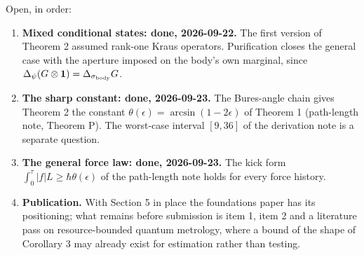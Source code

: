\documentclass[11pt,a4paper]{article}
\newcommand{\tightlist}{\setlength{\itemsep}{0pt}\setlength{\parskip}{0pt}}
\begin{document}
Open, in order:

\begin{enumerate}
\def\labelenumi{\arabic{enumi}.}
\tightlist
\item
  \textbf{Mixed conditional states: done, 2026-09-22.} The first version
  of Theorem 2 assumed rank-one Kraus operators. Purification closes the
  general case with the aperture imposed on the body's own marginal,
  since \(\Delta_\psi(G\otimes\mathbf 1)=\Delta_{\sigma_{\rm body}}G\).
\item
  \textbf{The sharp constant: done, 2026-09-23.} The Bures-angle chain
  gives Theorem 2 the constant \(\theta(\epsilon)=\arcsin(1-2\epsilon)\)
  of Theorem 1 (path-length note, Theorem P). The worst-case interval
  \([9,36]\) of the derivation note is a separate question.
\item
  \textbf{The general force law: done, 2026-09-23.} The kick form
  \(\int_0^\tau|f|L\ge\hbar\theta(\epsilon)\) of the path-length note
  holds for every force history.
\item
  \textbf{Publication.} With Section 5 in place the foundations paper
  has its positioning; what remains before submission is item 1, item 2
  and a literature pass on resource-bounded quantum metrology, where a
  bound of the shape of Corollary 3 may already exist for estimation
  rather than testing.
\end{enumerate}
\end{document}
